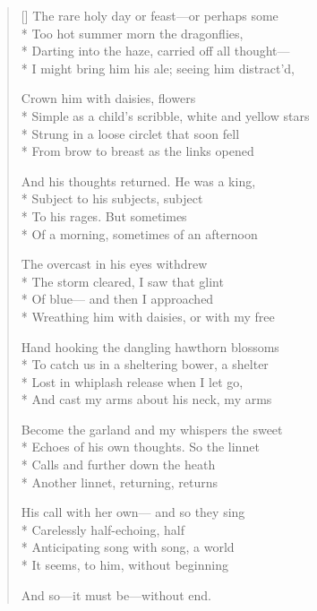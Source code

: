 \label{ch:lear_ab}
\settowidth{\versewidth}{Simple as a child's scribble, white and yellow stars}
\begin{verse}[\versewidth]
The rare holy day or feast---or perhaps some\\*
Too hot summer morn the dragonflies,\\*
Darting into the haze, carried off all thought---\\*
I might bring him his ale; seeing him distract'd,

Crown him with daisies, flowers\\*
Simple as a child's scribble, white and yellow stars\\*
Strung in a loose circlet that soon fell\\*
From brow to breast as the links opened

And his thoughts returned. He was a king,\\*
Subject to his subjects, subject\\*
To his rages. But sometimes\\*
Of a morning, sometimes of an afternoon

The overcast in his eyes withdrew\\*
The storm cleared, I saw that glint\\*
Of blue--- and then I approached\\*
Wreathing him with daisies, or with my free

Hand hooking the dangling hawthorn blossoms\\*
To catch us in a sheltering bower, a shelter\\*
Lost in whiplash release when I let go,\\*
And cast my arms about his neck, my arms

Become the garland and my whispers the sweet\\*
Echoes of his own thoughts.   So the linnet\\*
Calls and further down the heath\\*
Another linnet, returning, returns

His call with her own--- and so they sing\\*
Carelessly half-echoing, half\\*
Anticipating song with song, a world\\*
It seems, to him, without beginning

And so---it must be---without end.
\end{verse}
